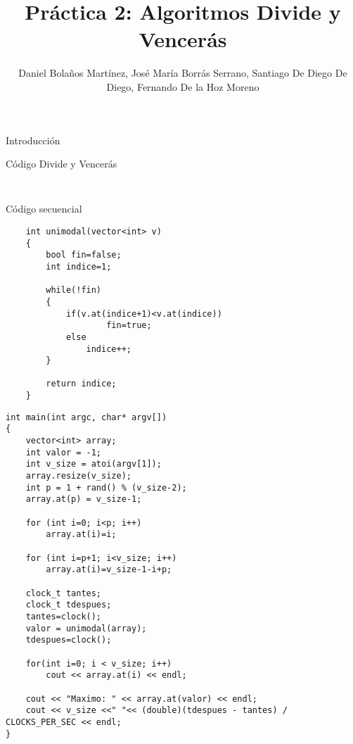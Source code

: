 \documentclass[12pt]{beamer}
\author{Daniel Bolaños Martínez, José María Borrás Serrano, Santiago De Diego De Diego, Fernando De la Hoz Moreno}
\title{Práctica 2: Algoritmos Divide y Vencerás}
\institute{ETSIIT}
\date{}
\begin{document}
\begin{frame}
\titlepage
\end{frame}

\begin{frame}
\tableofcontents
\end{frame}

\begin{frame}{Introducción}

\end{frame}

\begin{frame}[fragile]{Código Divide y Vencerás}
	\begin{lstlisting}
	
	\end{lstlisting}
\end{frame}

\begin{frame}[fragile]{Código secuencial}
	\begin{lstlisting}
	int unimodal(vector<int> v)
	{
  		bool fin=false;
  		int indice=1;
  		
  		while(!fin)
  		{
   	 		if(v.at(indice+1)<v.at(indice))
        			fin=true;
     		else
        		indice++;
  		}
  		
 	 	return indice;
	}
	\end{lstlisting}
\end{frame}
\begin{frame}[fragile]
	\begin{lstlisting}
int main(int argc, char* argv[])
{
  	vector<int> array;
  	int valor = -1;
  	int v_size = atoi(argv[1]);
  	array.resize(v_size);
    int p = 1 + rand() % (v_size-2);
    array.at(p) = v_size-1;
    
    for (int i=0; i<p; i++) 
        array.at(i)=i;
        
    for (int i=p+1; i<v_size; i++) 
        array.at(i)=v_size-1-i+p;

  	clock_t tantes;
  	clock_t tdespues;
  	tantes=clock();
  	valor = unimodal(array);
 	tdespues=clock();
 	
  	for(int i=0; i < v_size; i++)
     	cout << array.at(i) << endl;
     	
    cout << "Maximo: " << array.at(valor) << endl;
	cout << v_size <<" "<< (double)(tdespues - tantes) / CLOCKS_PER_SEC << endl;
}
	\end{lstlisting}

\end{frame}
\end{document}
